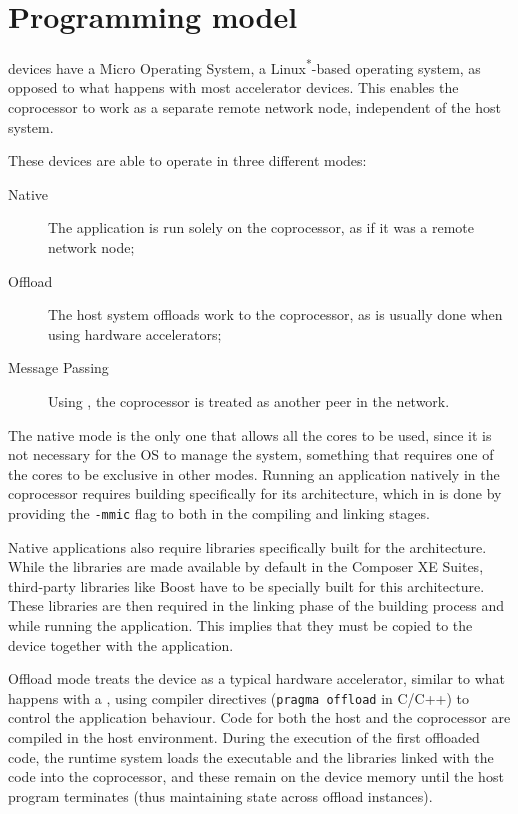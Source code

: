\documentclass[../thesis]{subfiles}
\begin{document}
	\section{Programming model}
	\label{sec:mic:programming}

	\intel\mic devices \cite{Intel:XeonPhi:QuickStartGuide} have a Micro Operating System, a Linux\textsuperscript{*}-based operating system, as opposed to what happens with most accelerator devices. This enables the coprocessor to work as a separate remote network node, independent of the host system.

	These devices are able to operate in three different modes:
		\begin{description}
			\item [Native] The application is run solely on the coprocessor, as if it was a remote network node;
			\item [Offload] The host system offloads work to the coprocessor, as is usually done when using hardware accelerators;
			\item [Message Passing] Using \mpi, the coprocessor is treated as another peer in the network.
		\end{description}

	The native mode is the only one that allows all the cores to be used, since it is not necessary for the OS to manage the system, something that requires one of the cores to be exclusive in other modes. Running an application natively in the coprocessor requires building specifically for its architecture, which in \icpc is done by providing the \texttt{-mmic} flag to both in the compiling and linking stages.

	Native applications also require libraries specifically built for the \intel\mic architecture. While the \intel libraries are made available by default in the \intel Composer XE Suites, third-party libraries like Boost have to be specially built for this architecture. These libraries are then required in the linking phase of the building process and while running the application. This implies that they must be copied to the device together with the application. 

	Offload mode treats the device as a typical hardware accelerator, similar to what happens with a \gpu, using compiler directives (\texttt{pragma offload} in C/C++) to control the application behaviour. Code for both the host and the coprocessor are compiled in the host environment. During the execution of the first offloaded code, the runtime system loads the executable and the libraries linked with the code into the coprocessor, and these remain on the device memory until the host program terminates (thus maintaining state across offload instances).
\end{document}
